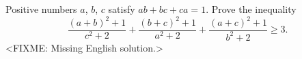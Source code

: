 \problem
Positive numbers $a$, $b$, $c$ satisfy $a b + b c + c a = 1$.
Prove the inequality
\[
    \frac{(a + b)^2 + 1}{c^2 + 2}
    +
    \frac{(b + c)^2 + 1}{a^2 + 2}
    +
    \frac{(a + c)^2 + 1}{b^2 + 2}
\geq
    3
.\]
\solution
<FIXME: Missing English solution.>
\endproblem
